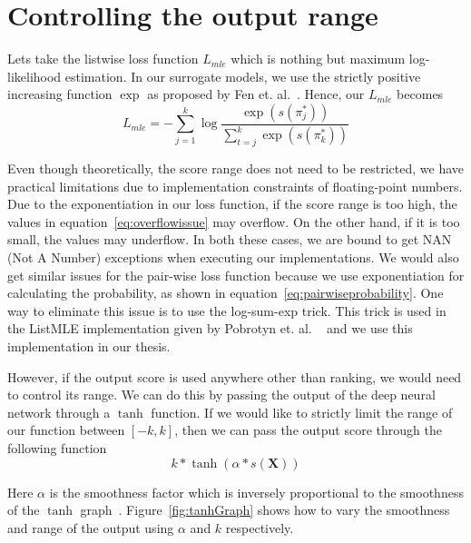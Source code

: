 \documentclass[12pt, twoside, ngerman]{report}
\begin{document}




\appendix
\newpage
{}
\chapter{Controlling the output range}
\label{chap:OutputRangeControl}

Lets take the listwise loss function $L_{mle}$ which is nothing but maximum log-likelihood estimation. 
In our surrogate models, we use the strictly positive increasing function $\exp$ as proposed by Fen et. al.~\cite{listmlepaper}.
Hence, our $L_{mle}$ becomes 
\begin{equation}\label{eq:overflowissue}
L_{mle} = -  \sum\limits_{j=1}^{k} \log \frac{\exp(s(\pi^*_j))}{ \sum\limits_{t=j}^k \exp(s(\pi^*_k))}
\end{equation}

Even though theoretically, the score range does not need to be restricted, we have practical limitations due to implementation constraints of floating-point numbers.
Due to the exponentiation in our loss function, if the score range is too high,  the values in equation~\ref{eq:overflowissue} may overflow.
On the other hand, if it is too small, the values may underflow.
In both these cases, we are bound to get NAN (Not A Number) exceptions when executing our implementations.
We would also get similar issues for the pair-wise loss function because we use exponentiation for calculating the probability, as shown in equation~\ref{eq:pairwiseprobability}.
One way to eliminate this issue is to use the log-sum-exp trick. This trick is used in the ListMLE implementation given by Pobrotyn
 et. al. ~\cite{Pobrotyn2020ContextAwareLT} and we use this implementation in our thesis.

However, if the output score is used anywhere other than ranking, we would need to control its range.
We can do this by passing the output of the deep neural network through a $\tanh$ function.
If we would like to strictly limit the range of our function between $[-k,  k]$,  then we can pass the output score through the following function
\begin{equation}\label{eq:tanhEquation}
k * \tanh(\alpha * s(\textbf{X}))
\end{equation}

Here $\alpha$ is the smoothness factor which is inversely proportional to the smoothness of the $\tanh$ graph~\cite{tanhstackoverflowanswer}.
Figure~\ref{fig:tanhGraph} shows how to vary the smoothness and range of the output using $\alpha$ and $k$ respectively.

\end{document}
